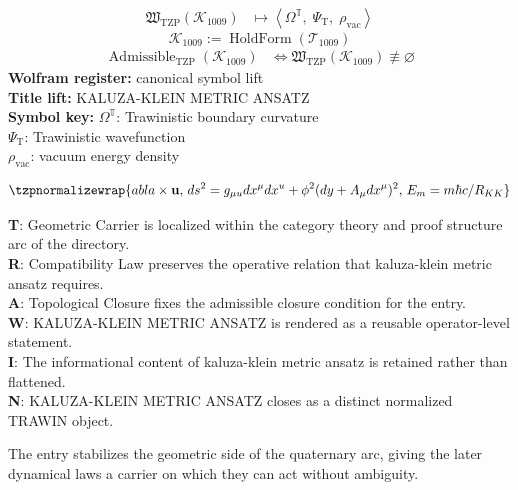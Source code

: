 \noindent
\begin{minipage}[t]{0.48\linewidth}
\begingroup
\small
\[
\begin{aligned}
\mathfrak{W}_{\mathrm{TZP}}\!\left(\mathcal{K}_{1009}\right)
&\longmapsto
\left\langle \Omega^{\mathbb{T}},\; \Psi_{\mathrm{T}},\; \rho_{\mathrm{vac}} \right\rangle
\end{aligned}
\]
\[
\mathcal{K}_{1009}
:=
\operatorname{HoldForm}\!\left(\mathcal{T}_{1009}\right)
\]
\[
\begin{aligned}
\operatorname{Admissible}_{\mathrm{TZP}}\!\left(\mathcal{K}_{1009}\right)
&\Longleftrightarrow
\mathfrak{W}_{\mathrm{TZP}}\!\left(\mathcal{K}_{1009}\right)\not\equiv\varnothing
\end{aligned}
\]
\textbf{Wolfram register:} canonical symbol lift\\
\textbf{Title lift:} KALUZA-KLEIN METRIC ANSATZ\\
\textbf{Symbol key:} \(\Omega^{\mathbb{T}}\): Trawinistic boundary curvature\\ \(\Psi_{\mathrm{T}}\): Trawinistic wavefunction\\ \(\rho_{\mathrm{vac}}\): vacuum energy density
\par
\endgroup
\end{minipage}\hfill
\begin{minipage}[t]{0.48\linewidth}
\[
\tzpnormalizewrap{abla \times \mathbf{u},\,ds^2 = g_{\mu u} dx^\mu dx^ u + \phi^2 (dy + A_\mu dx^\mu)^2,\,E_m = m \hbar c / R_{KK}}
\]

\small
\textbf{T}: Geometric Carrier is localized within the category theory and proof structure arc of the directory.\\
\textbf{R}: Compatibility Law preserves the operative relation that kaluza-klein metric ansatz requires.\\
\textbf{A}: Topological Closure fixes the admissible closure condition for the entry.\\
\textbf{W}: KALUZA-KLEIN METRIC ANSATZ is rendered as a reusable operator-level statement.\\
\textbf{I}: The informational content of kaluza-klein metric ansatz is retained rather than flattened.\\
\textbf{N}: KALUZA-KLEIN METRIC ANSATZ closes as a distinct normalized TRAWIN object.
\normalsize
\end{minipage}

The entry stabilizes the geometric side of the quaternary arc, giving the later dynamical laws a carrier on which they can act without ambiguity.
\clearpage

